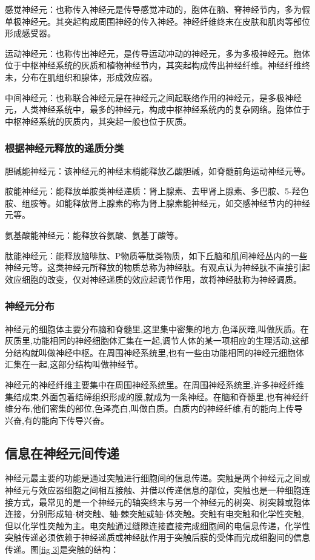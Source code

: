 \documentclass[a4paper,12pt]{article}
\begin{document}
感觉神经元：也称传入神经元是传导感觉冲动的，胞体在脑、脊神经节内，多为假单极神经元。其突起构成周围神经的传入神经。神经纤维终末在皮肤和肌肉等部位形成感受器。


运动神经元：也称传出神经元，是传导运动冲动的神经元，多为多极神经元。胞体位于中枢神经系统的灰质和植物神经节内，其突起构成传出神经纤维。神经纤维终未，分布在肌组织和腺体，形成效应器。


中间神经元：也称联合神经元是在神经元之间起联络作用的神经元，是多极神经元，人类神经系统中，最多的神经元，构成中枢神经系统内的复杂网络。胞体位于中枢神经系统的灰质内，其突起一般也位于灰质。


\subsubsection{根据神经元释放的递质分类}

胆碱能神经元：该神经元的神经末梢能释放乙酸胆碱，如脊髓前角运动神经元等。


胺能神经元：能释放单胺类神经递质：肾上腺素、去甲肾上腺素、多巴胺、5-羟色胺、组胺等。如能释放肾上腺素的称为肾上腺素能神经元，如交感神经节内的神经元等。


氨基酸能神经元：能释放谷氨酸、氨基丁酸等。


肽能神经元：能释放脑啡肽、P物质等肽类物质，如下丘脑和肌间神经丛内的一些神经元等。这类神经元所释放的物质总称为神经肽。有观点认为神经肽不直接引起效应细胞的改变，仅对神经递质的效应起调节作用，故将神经肽称为神经调质。

\subsubsection{神经元分布}

神经元的细胞体主要分布脑和脊髓里,这里集中密集的地方,色泽灰暗,叫做灰质。在灰质里,功能相同的神经细胞体汇集在一起,调节人体的某一项相应的生理活动,这部分结构就叫做神经中枢。在周围神经系统里,也有一些由功能相同的神经元细胞体汇集在一起,这部分结构叫做神经节。


神经元的神经纤维主要集中在周围神经系统里。在周围神经系统里,许多神经纤维集结成束,外面包着结缔组织形成的膜,就成为一条神经。在脑和脊髓里,也有神经纤维分布,他们密集的部位,色泽亮白,叫做白质。白质内的神经纤维,有的能向上传导兴奋,有的能向下传导兴奋。


\subsection{信息在神经元间传递}


神经元最主要的功能是通过突触进行细胞间的信息传递。突触是两个神经元之间或神经元与效应器细胞之间相互接触、并借以传递信息的部位，突触也是一种细胞连接方式，最常见的是一个神经元的轴突终末与另一个神经元的树突、树突棘或胞体连接，分别形成轴-树突触、轴-棘突触或轴-体突触。突触有电突触和化学性突触,但以化学性突触为主。电突触通过缝隙连接直接完成细胞间的电信息传递，化学性突触传递必须依赖于神经递质或神经肽作用于突触后膜的受体而完成细胞间的信息传递。图\ref{fig 3}是突触的结构：
\end{document}
